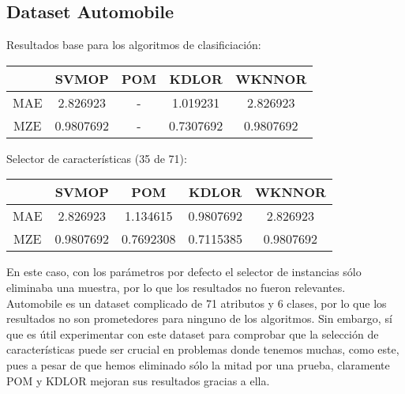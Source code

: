 \subsection{Dataset Automobile}
Resultados base para los algoritmos de clasificiación:
\begin{center}
\begin{tabular}{ c c c c c }
	& SVMOP & POM & KDLOR & WKNNOR \\
	\hline	
	MAE &   2.826923  & - & 1.019231 &  2.826923 \\
	MZE &	0.9807692 & - & 0.7307692 & 0.9807692  \\
	\hline  
\end{tabular}
\end{center}
\vspace{20pt}
Selector de características (35 de 71):
\begin{center}
\begin{tabular}{ c c c c c }
	& SVMOP & POM & KDLOR & WKNNOR  \\
	\hline	
	MAE &   2.826923  & 1.134615 & 0.9807692 &  2.826923 \\
	MZE &	0.9807692 & 0.7692308 & 0.7115385 & 0.9807692  \\
	\hline  
\end{tabular}
\end{center}

En este caso, con los parámetros por defecto el selector de instancias sólo eliminaba una muestra, por lo que los resultados no fueron relevantes. Automobile es un dataset complicado de 71 atributos y 6 clases, por lo que los resultados no son prometedores para ninguno de los algoritmos. Sin embargo, sí que es útil experimentar con este dataset para comprobar que la selección de características puede ser crucial en problemas donde tenemos muchas, como este, pues a pesar de que hemos eliminado sólo la mitad por una prueba, claramente POM y KDLOR mejoran sus resultados gracias a ella.

